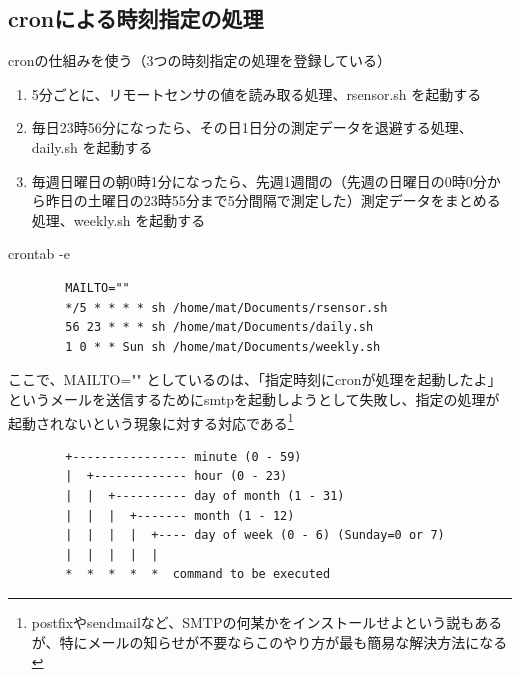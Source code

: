 \documentclass[12pt,a4j]{jsbook}
\begin{document}

\newpage

\subsection{cronによる時刻指定の処理}

cronの仕組みを使う（3つの時刻指定の処理を登録している）
\begin{enumerate}
	\item[(1)] 5分ごとに、リモートセンサの値を読み取る処理、rsensor.sh を起動する
	\item[(2)] 毎日23時56分になったら、その日1日分の測定データを退避する処理、daily.sh を起動する
	\item[(3)] 毎週日曜日の朝0時1分になったら、先週1週間の（先週の日曜日の0時0分から昨日の土曜日の23時55分まで5分間隔で測定した）測定データをまとめる処理、weekly.sh を起動する
\end{enumerate}

\begin{spacing}{0.95}
\begin{itembox}[l]{crontab -e}
\begin{verbatim}
		MAILTO=""
		*/5 * * * * sh /home/mat/Documents/rsensor.sh
		56 23 * * * sh /home/mat/Documents/daily.sh
		1 0 * * Sun sh /home/mat/Documents/weekly.sh
\end{verbatim}
\end{itembox}
\end{spacing}

ここで、MAILTO="" としているのは、「指定時刻にcronが処理を起動したよ」というメールを送信するためにsmtpを起動しようとして失敗し、指定の処理が起動されないという現象に対する対応である\footnote{postfixやsendmailなど、SMTPの何某かをインストールせよという説もあるが、特にメールの知らせが不要ならこのやり方が最も簡易な解決方法になる}

\begin{spacing}{0.95}
\begin{screen}
\begin{verbatim}
		+---------------- minute (0 - 59)
		|  +------------- hour (0 - 23)
		|  |  +---------- day of month (1 - 31)
		|  |  |  +------- month (1 - 12)
		|  |  |  |  +---- day of week (0 - 6) (Sunday=0 or 7)
		|  |  |  |  |
		*  *  *  *  *  command to be executed
\end{verbatim}
\end{screen}
\end{spacing}
\end{document}
